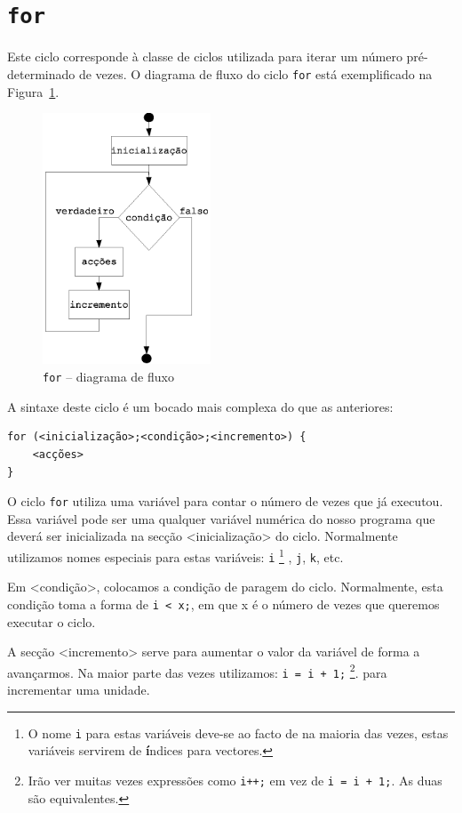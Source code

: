 \section{\texttt{for}}
Este ciclo corresponde à classe de ciclos utilizada para iterar um número pré-determinado de vezes.
O diagrama de fluxo do ciclo \texttt{for} está exemplificado na Figura~\ref{fig:para}.
\begin{figure}[h]
	\centering
		\includegraphics[width=5cm]{images/para.eps}
	\caption{\texttt{for} -- diagrama de fluxo}
	\label{fig:para}
\end{figure}
A sintaxe deste ciclo é um bocado mais complexa do que as anteriores:
\begin{lstlisting}
for (<inicialização>;<condição>;<incremento>) {
    <acções>
}
\end{lstlisting}

O ciclo \texttt{for} utiliza uma variável para contar o número de vezes que já executou. Essa variável pode ser uma qualquer variável numérica do nosso programa que deverá ser inicializada na secção <inicialização> do ciclo. Normalmente utilizamos nomes especiais para estas variáveis: \texttt{i}%
\footnote{O nome \texttt{i} para estas variáveis deve-se ao facto de na maioria das vezes, estas variáveis servirem de \textbf{í}ndices para vectores.}%
, \texttt{j}, \texttt{k}, etc.

Em <condição>, colocamos a condição de paragem do ciclo. Normalmente, esta condição toma a forma de \texttt{i < x;}, em que x é o número de vezes que queremos executar o ciclo.

A secção <incremento> serve para aumentar o valor da variável de forma a avançarmos. Na maior parte das vezes utilizamos: \texttt{i = i + 1;}%
\footnote{Irão ver muitas vezes expressões como \texttt{i++;} em vez de \texttt{i = i + 1;}. As duas são equivalentes.}. 
 para incrementar uma unidade.


